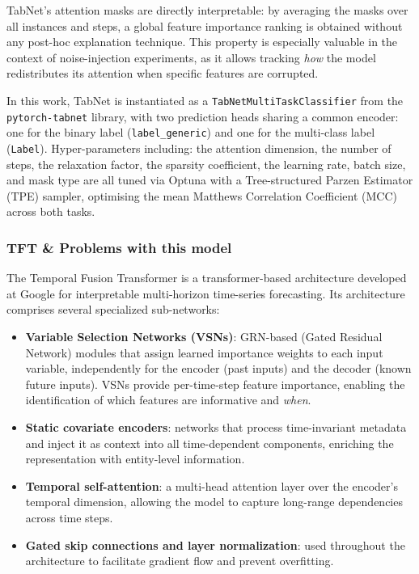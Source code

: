 \documentclass[../main.tex]{subfiles}
\begin{document}
TabNet's attention masks are directly interpretable: by averaging the masks over all instances and steps, a global feature importance ranking is obtained without any post-hoc explanation technique.  This property is especially valuable in the context of noise-injection experiments, as it allows tracking \emph{how} the model redistributes its attention when specific features are corrupted.

In this work, TabNet is instantiated as a \texttt{TabNetMultiTaskClassifier} from the \texttt{pytorch-tabnet} library, with two prediction heads sharing a common encoder: one for the binary label (\texttt{label\_generic}) and one for the multi-class label (\texttt{Label}).
Hyper-parameters including: the attention dimension, the number of steps, the relaxation factor, the sparsity coefficient, the learning rate, batch size, and mask type are all tuned via Optuna with a Tree-structured Parzen Estimator (TPE) sampler, optimising the mean Matthews Correlation Coefficient (MCC) across both tasks.

\newpage
\subsubsection{TFT \& Problems with this model}
\label{Chapter: model TFT}

The Temporal Fusion Transformer is a transformer-based architecture developed at Google for interpretable multi-horizon time-series forecasting. Its architecture comprises several specialized sub-networks:

\begin{itemize}
    \item \textbf{Variable Selection Networks (VSNs)}: GRN-based (Gated Residual Network) modules that assign learned importance weights to each input variable, independently for the encoder (past inputs) and the decoder (known future inputs).  VSNs provide per-time-step feature importance, enabling the identification of which features are informative and \emph{when}.
    \item \textbf{Static covariate encoders}: networks that process time-invariant metadata and inject it as context into all time-dependent components, enriching the representation with entity-level information.
    \item \textbf{Temporal self-attention}: a multi-head attention layer over the encoder's temporal dimension, allowing the model to capture long-range dependencies across time steps.
    \item \textbf{Gated skip connections and layer normalization}: used throughout the architecture to facilitate gradient flow and prevent overfitting.
\end{itemize}
\end{document}
